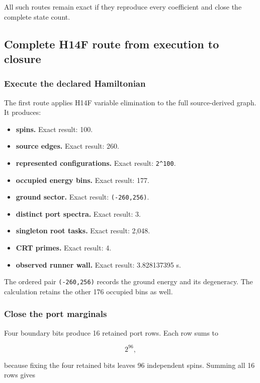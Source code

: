 All such routes remain exact if they reproduce every coefficient and
close the complete state count.

\subsection{Complete H14F route from execution to
closure}\label{viii-ch01-complete-h14f-route-from-execution-to-closure}

\subsubsection{Execute the declared
Hamiltonian}\label{viii-ch01-execute-the-declared-hamiltonian}

The first route applies H14F variable elimination to the full
source-derived graph. It produces:

\begin{itemize}
\tightlist
\item
  \textbf{spins.} Exact result: 100.
\item
  \textbf{source edges.} Exact result: 260.
\item
  \textbf{represented configurations.} Exact result: \texttt{2\^{}100}.
\item
  \textbf{occupied energy bins.} Exact result: 177.
\item
  \textbf{ground sector.} Exact result: \texttt{(-260,256)}.
\item
  \textbf{distinct port spectra.} Exact result: 3.
\item
  \textbf{singleton root tasks.} Exact result: 2,048.
\item
  \textbf{CRT primes.} Exact result: 4.
\item
  \textbf{observed runner wall.} Exact result: 3.828137395 s.
\end{itemize}

The ordered pair \texttt{(-260,256)} records the ground energy and its
degeneracy. The calculation retains the other 176 occupied bins as well.

\subsubsection{Close the port marginals}\label{viii-ch01-close-the-port-marginals}

Four boundary bits produce 16 retained port rows. Each row sums to

\[
2^{96},
\]

because fixing the four retained bits leaves 96 independent spins.
Summing all 16 rows gives

